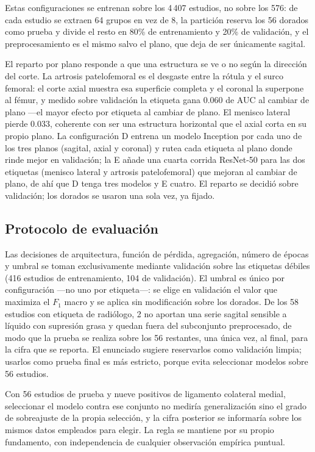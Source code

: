 \documentclass{article}
\begin{document}
Estas configuraciones se entrenan sobre los 4\,407 estudios, no sobre los 576:
de cada estudio se extraen 64 grupos en vez de 8, la partición reserva los 56
dorados como prueba y divide el resto en 80\% de entrenamiento y 20\% de
validación, y el preprocesamiento es el mismo salvo el plano, que deja de ser
únicamente sagital.

El reparto por plano responde a que una estructura se ve o no según la dirección
del corte. La artrosis patelofemoral es el desgaste entre la rótula y el surco
femoral: el corte axial muestra esa superficie completa y el coronal la superpone
al fémur, y medido sobre validación la etiqueta gana 0.060 de AUC al cambiar de
plano ---el mayor efecto por etiqueta al cambiar de plano. El menisco lateral
pierde 0.033, coherente con ser una estructura horizontal que el axial corta en
su propio plano. La configuración D entrena un modelo Inception por cada uno de
los tres planos (sagital, axial y coronal) y rutea cada etiqueta al plano donde
rinde mejor en validación; la E añade una cuarta corrida ResNet-50 para las dos
etiquetas (menisco lateral y artrosis patelofemoral) que mejoran al cambiar de
plano, de ahí que D tenga tres modelos y E cuatro. El reparto se decidió sobre
validación; los dorados se usaron una sola vez, ya fijado.

\subsection{Protocolo de evaluación}

Las decisiones de arquitectura, función de pérdida, agregación, número de épocas
y umbral se toman exclusivamente mediante validación sobre las etiquetas débiles
(416 estudios de entrenamiento, 104 de validación). El umbral es único por
configuración ---no uno por etiqueta---: se elige en validación el valor que
maximiza el $F_1$ macro y se aplica sin modificación sobre los dorados. De los 58
estudios con etiqueta de radiólogo, 2 no aportan una serie sagital sensible a
líquido con supresión grasa y quedan fuera del subconjunto preprocesado, de modo
que la prueba se realiza sobre los 56 restantes, una única vez, al final, para la
cifra que se reporta. El enunciado sugiere reservarlos como validación limpia;
usarlos como prueba final es más estricto, porque evita seleccionar modelos sobre
56 estudios.

Con 56 estudios de prueba y nueve positivos
de ligamento colateral medial, seleccionar el modelo contra ese conjunto no
mediría generalización sino el grado de sobreajuste de la propia selección, y la
cifra posterior se informaría sobre los mismos datos empleados para elegir. La
regla se mantiene por su propio fundamento, con independencia de cualquier
observación empírica puntual.
\end{document}
